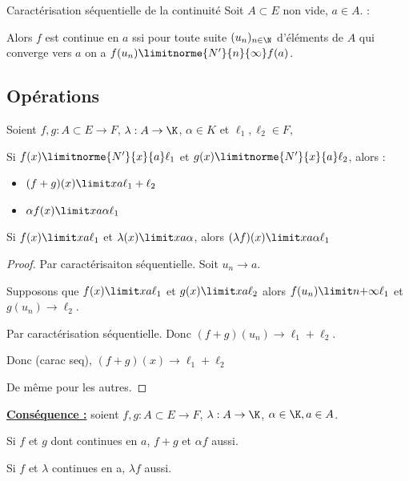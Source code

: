 \begin{theoreme}{Caractérisation séquentielle de la continuité}{}
    Soit $A \subset E$ non vide, $a \in A$. :

    Alors $f$ est continue en $a$ ssi pour toute suite $(u_n)_{n \in \N}$ d'éléments de $A$ 
    qui converge vers $a$ on a $f(u_n) \limitnorme{N'}{n}{\infty} f(a)$.
\end{theoreme}

\subsection{Opérations}

\begin{theoreme}{}{}
    Soient $f, g : A \subset E \to F$, $\lambda : A \to \K$, $\alpha \in K$ et $\ell_1, \ell_2 \in F$, 

    Si $f(x) \limitnorme{N'}{x}{a} \ell_1$ et $g(x) \limitnorme{N'}{x}{a} \ell_2$, alors :
    \begin{itemize}
        \item  $(f + g)(x) \limit x a \ell_1 + \ell_2$
        \item $\alpha f(x) \limit x a \alpha \ell_1$ 
    \end{itemize}

    Si $f(x) \limit x a \ell_1$ et $\lambda(x) \limit x a \alpha$, alors $(\lambda f)(x) \limit x a \alpha \ell_1$
\end{theoreme}


\begin{proof}
    Par caractérisaiton séquentielle. Soit $u_n \longrightarrow a$. 

    Supposons que $f(x) \limit x a \ell_1$ et $g(x) \limit x a \ell_2$ alors 
    $f(u_n) \limit n {+ \infty} \ell_1$ et $g(u_n) \longrightarrow \ell_2$. 

    Par caractérisation séquentielle. Donc $(f + g)(u_n) \longrightarrow \ell_1 + \ell_2$. 

    Donc (carac seq), $(f + g)(x) \longrightarrow \ell_1 + \ell_2$

    De même pour les autres. 
\end{proof}

\textbf{\uline{Conséquence :}} soient $f, g : A \subset E \to F$, $\lambda : A \to \K$, $\alpha \in \K, a \in A$. 

Si $f$ et $g$ dont continues en $a$, $f + g$ et $\alpha f$ aussi. 

Si $f$ et $\lambda$ continues en a, $\lambda f$ aussi. 


